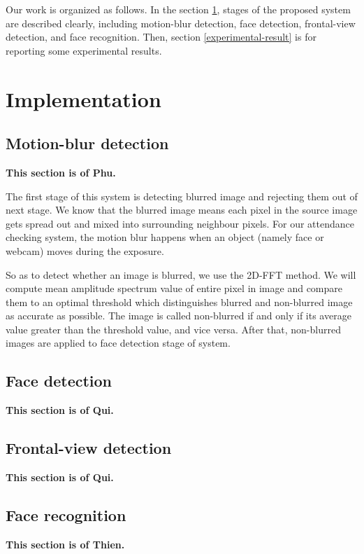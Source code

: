 \documentclass[journal, twocolumn]{IEEEtran}
\begin{document}
Our work is organized as follows. In the section \ref{implementation}, stages of the proposed system are described clearly, including motion-blur detection, face detection, frontal-view detection, and face recognition. Then, section \ref{experimental-result} is for reporting some experimental results.


\medskip
\section{Implementation}
\label{implementation}

\subsection{Motion-blur detection}
\label{motion-blur-detection}
\textbf{This section is of Phu.}

The first stage of this system is detecting blurred image and rejecting them out of next stage. We know that the blurred image means each pixel in the source image gets spread out and mixed into surrounding neighbour pixels. For our attendance checking system, the motion blur happens when an object (namely face or webcam) moves during the exposure. 

So as to detect whether an image is blurred, we use the 2D-FFT method. We will compute mean amplitude spectrum value of entire pixel in image and compare them to an optimal threshold which distinguishes blurred and non-blurred image as accurate as possible. The image is called non-blurred if and only if its average value greater than the threshold value, and vice versa. After that, non-blurred images are applied to face detection stage of system.

\subsection{Face detection}
\label{face-detection}
\textbf{This section is of Qui.}

\subsection{Frontal-view detection}
\label{frontal-view-detection}
\textbf{This section is of Qui.}

\subsection{Face recognition}
\label{face-recognition}
\textbf{This section is of Thien.}
\end{document}

